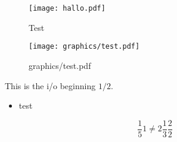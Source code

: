 

\begin{figure}[h]
    \centering
    \texttt{[image: hallo.pdf]}
    \caption{Test}
    \label{fig:hallo-pdf}
\end{figure}
    
\begin{figure}[h]
    \centering
    \texttt{[image: graphics/test.pdf]}
    \caption{graphics/test.pdf}
    \label{fig:graphics-test-pdf}
\end{figure}

This is the i/o beginning $1/2$.
\begin{itemize}
    \item test
\end{itemize}

\begin{equation}
    \frac{1}{5}
    1 \neq  2
    \frac{1}{3}
    \frac{2}{2}
\end{equation}


